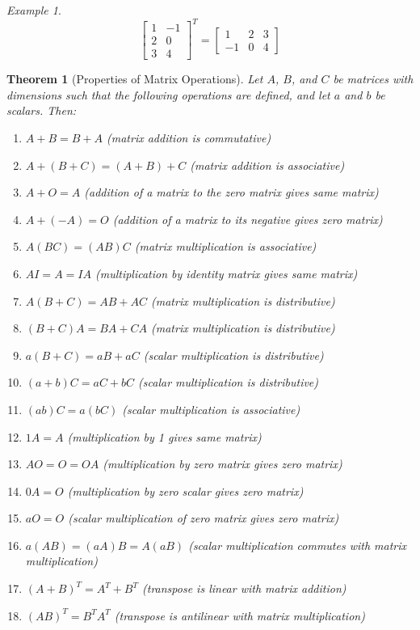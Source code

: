 \documentclass[10pt, a4paper]{amsart}
\newtheorem{thm}{Theorem}
\theoremstyle{definition}
\theoremstyle{remark}
\newtheorem{ex}{Example}
\begin{document}
\begin{ex}
  \begin{displaymath}
    \begin{bmatrix} 1 & -1 \\ 2 & 0 \\ 3 & 4 \end{bmatrix}^T = \begin{bmatrix} 1 & 2 & 3 \\ -1 & 0 & 4 \end{bmatrix}
  \end{displaymath}
\end{ex}

\begin{thm}[Properties of Matrix Operations]
  Let $ A $, $ B $, and $ C $ be matrices with dimensions such that the following operations are defined, and
  let $ a $ and $ b $ be scalars. Then:
  \begin{enumerate}
    \item $ A + B = B + A $ (matrix addition is commutative)
    \item $ A + (B + C) = (A + B) + C $ (matrix addition is associative)
    \item $ A + O = A $ (addition of a matrix to the zero matrix gives same matrix)
    \item $ A + (-A) = O $ (addition of a matrix to its negative gives zero matrix)
    \item $ A(BC) = (AB)C $ (matrix multiplication is associative)
    \item $ AI = A = IA $ (multiplication by identity matrix gives same matrix)
    \item $ A(B + C) = AB + AC $ (matrix multiplication is distributive)
    \item $ (B + C)A = BA + CA $ (matrix multiplication is distributive)
    \item $ a(B + C) = aB + aC $ (scalar multiplication is distributive)
    \item $ (a + b)C = aC + bC $ (scalar multiplication is distributive)
    \item $ (ab)C = a(bC) $ (scalar multiplication is associative)
    \item $ 1A = A $ (multiplication by 1 gives same matrix)
    \item $ AO = O = OA $ (multiplication by zero matrix gives zero matrix)
    \item $ 0A = O $ (multiplication by zero scalar gives zero matrix)
    \item $ aO = O $ (scalar multiplication of zero matrix gives zero matrix)
    \item $ a(AB) = (aA)B = A(aB) $ (scalar multiplication commutes with matrix multiplication)
    \item $ (A + B)^T = A^T + B^T $ (transpose is linear with matrix addition)
    \item $ (AB)^T = B^T A^T $ (transpose is antilinear with matrix multiplication)
  \end{enumerate}
\end{thm}
\end{document}
